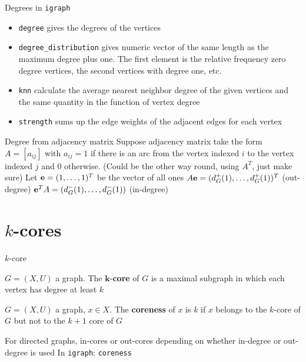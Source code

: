 \documentclass[aspectratio=43]{beamer}
\begin{document}
\begin{frame}{Degrees in {\tt igraph}}
	\begin{itemize}
		\item {\tt degree} gives the degrees of the vertices
		\item {\tt degree\_distribution} gives numeric vector of the same length as the maximum degree plus one. The first element is the relative frequency zero degree vertices, the second vertices with degree one, etc.
		\item {\tt knn} calculate the average nearest neighbor degree of the given vertices and the same quantity in the function of vertex degree
		\item {\tt strength} sums up the edge weights of the adjacent edges for each vertex
	\end{itemize}
\end{frame}

\begin{frame}{Degree from adjacency matrix}
	Suppose adjacency matrix take the form $A=[a_{ij}]$ with $a_{ij}=1$ if there is an arc from the vertex indexed $i$ to the vertex indexed $j$ and 0 otherwise. (Could be the other way round, using $A^T$, just make sure)
	\vfill
	Let $\mathbf{e}=(1,\ldots,1)^T$ be the vector of all ones 
	\vfill
	$A\mathbf{e}=(d_G^+(1),\ldots,d_G^+(1))^T$ (out-degree)
	\vfill
	$\mathbf{e}^TA=(d_G^-(1),\ldots,d_G^-(1))$ (in-degree)
\end{frame}

\section{$k$-cores}

\begin{frame}{$k$-core}
	\begin{definition}
		$G=(X,U)$ a graph. The $\mathbf{k}$-\textbf{core} of $G$ is a maximal subgraph in which each vertex has degree at least $k$
	\end{definition}
	\vfill
	\begin{definition}
		$G=(X,U)$ a graph, $x\in X$. The \textbf{coreness} of $x$ is $k$ if $x$ belongs to the $k$-core of $G$ but not to the $k+1$ core of $G$
	\end{definition}
	\vfill
	For directed graphs, in-cores or out-cores depending on whether in-degree or out-degree is used
	\vfill
	In {\tt igraph}: {\tt coreness}
\end{frame}
\end{document}
